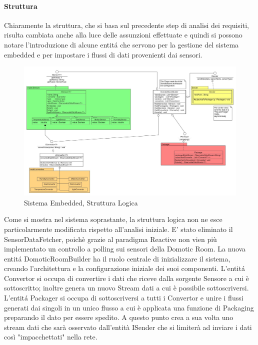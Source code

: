 \afterpage{\clearpage}

\newpage


\paragraph{Struttura} Chiaramente la struttura, che si basa sul precedente step di analisi dei requisiti, risulta cambiata anche alla luce delle assunzioni effettuate e quindi si possono notare l'introduzione di alcune entit\'a che servono per la gestione del sistema embedded e per impostare i flussi di dati provenienti dai sensori.

\begin{figure}[h]
\centering
\includegraphics[width=\textwidth]{Figures/LogicArchitecture/EmbeddedSystem/Structure}
\caption{Sistema Embedded, Struttura Logica}
\end{figure}

Come si mostra nel sistema soprastante, la struttura logica non ne esce particolarmente modificata rispetto all'analisi iniziale.
E' stato eliminato il SensorDataFetcher, poich\`e grazie al paradigma Reactive non vien più implementato un controllo a polling sui sensori della Domotic Room.
La nuova entit\'a DomoticRoomBuilder ha il ruolo centrale di inizializzare il sistema, creando l'architettura e la configurazione iniziale dei suoi componenti.
L'entit\'a Convertor si occupa di convertire i dati che riceve dalla sorgente Sensore a cui è sottoscritto; inoltre genera un nuovo Stream dati a cui è possibile sottoscriversi.
L'entit\'a Packager si occupa di sottoscriversi a tutti i Convertor e unire i flussi generati dai singoli in un unico flusso a cui è applicata una funzione di Packaging preparando il dato per essere spedito. A questo punto crea a sua volta uno stream dati che sarà osservato dall'entità ISender che si limiterà ad inviare i dati così "impacchettati" nella rete.


